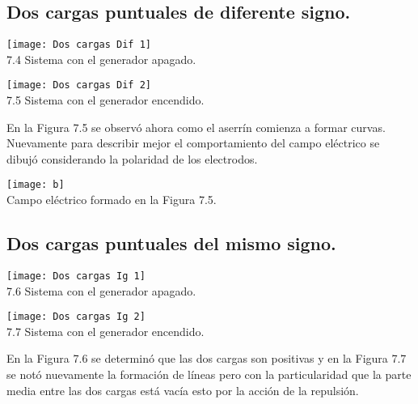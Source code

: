 \documentclass[10pt]{article}
\begin{document}
\begin{multicols}{2}
	\subsection{Dos cargas puntuales de diferente signo.}

	\begin{center}
		\texttt{[image: Dos cargas Dif 1]}\\
		7.4 Sistema con el generador apagado.
	\end{center}

	\begin{center}
				\centering
		\texttt{[image: Dos cargas Dif 2]}\\
		7.5 Sistema con el generador encendido.
		\label{fig:CDif1}
	\end{center}

	En la Figura 7.5 se observó ahora como el aserrín comienza a formar curvas. Nuevamente para describir mejor el comportamiento del campo eléctrico se dibujó considerando la polaridad de los electrodos.

	\begin{center}
	
		\texttt{[image: b]}\\
		Campo eléctrico formado en la Figura 7.5.

	\end{center}


	\subsection{Dos cargas puntuales del mismo signo.}

	\begin{center}
		\texttt{[image: Dos cargas Ig 1]}\\

		7.6 Sistema con el generador apagado.
		\label{fig:2CarIA}
	\end{center}

	\begin{center}
		\centering
		\texttt{[image: Dos cargas Ig 2]}\\
		7.7 Sistema con el generador encendido.
		\label{fig:2CarI}
	\end{center}

	En la Figura 7.6 se determinó que las dos cargas son positivas y en la Figura 7.7 se notó nuevamente la formación de líneas pero con la particularidad que la parte media entre las dos cargas está vacía esto por la acción de la repulsión.


\end{multicols}
\end{document}
